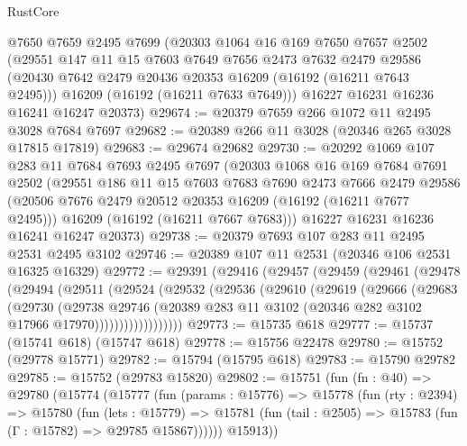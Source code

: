\begin{lexlean}{RustCore}
\begin{coremodule}
    @7650
    @7659
    @2495
    @7699
    (@20303
      @1064
      @16
      @169
      @7650
      @7657
      @2502
      (@29551
        @147
        @11
        @15
        @7603
        @7649
        @7656
        @2473
        @7632
        @2479
        @29586
        (@20430 @7642 @2479 @20436 @20353 @16209 (@16192 (@16211 @7643 @2495)))
        @16209
        (@16192 (@16211 @7633 @7649)))
      @16227
      @16231
      @16236
      @16241
      @16247
      @20373)
@29674 := @20379 @7659 @266 @1072 @11 @2495 @3028 @7684 @7697
@29682 := @20389 @266 @11 @3028 (@20346 @265 @3028 @17815 @17819)
@29683 := @29674 @29682
@29730 := @20292
    @1069
    @107
    @283
    @11
    @7684
    @7693
    @2495
    @7697
    (@20303
      @1068
      @16
      @169
      @7684
      @7691
      @2502
      (@29551
        @186
        @11
        @15
        @7603
        @7683
        @7690
        @2473
        @7666
        @2479
        @29586
        (@20506 @7676 @2479 @20512 @20353 @16209 (@16192 (@16211 @7677 @2495)))
        @16209
        (@16192 (@16211 @7667 @7683)))
      @16227
      @16231
      @16236
      @16241
      @16247
      @20373)
@29738 := @20379 @7693 @107 @283 @11 @2495 @2531 @2495 @3102
@29746 := @20389 @107 @11 @2531 (@20346 @106 @2531 @16325 @16329)
@29772 := @29391
    (@29416
      (@29457
        (@29459
          (@29461
            (@29478
              (@29494
                (@29511
                  (@29524
                    (@29532
                      (@29536
                        (@29610
                          (@29619
                            (@29666
                              (@29683
                                (@29730
                                  (@29738
                                    @29746
                                    (@20389
                                      @283
                                      @11
                                      @3102
                                      (@20346 @282 @3102 @17966 @17970))))))))))))))))))
@29773 := @15735 @618
@29777 := @15737 (@15741 @618) (@15747 @618)
@29778 := @15756 @22478
@29780 := @15752 (@29778 @15771)
@29782 := @15794 (@15795 @618)
@29783 := @15790 @29782
@29785 := @15752 (@29783 @15820)
@29802 := @15751
    (fun (fn : @40) =>
    @29780
      (@15774
        (@15777
          (fun (params : @15776) =>
          @15778
            (fun (rty : @2394) =>
            @15780
              (fun (lets : @15779) =>
              @15781 (fun (tail : @2505) => @15783 (fun (Γ : @15782) => @29785 @15867))))))
        @15913))

\end{coremodule}
\end{lexlean}

